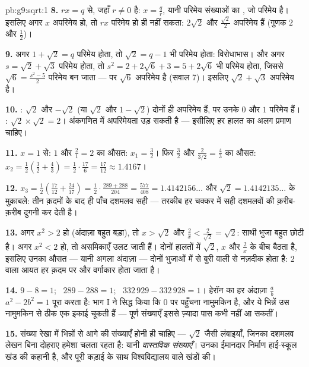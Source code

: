\begin{solution}{pb:g9:sqrt:1}
\textbf{8.} $r x = q$ से, जहाँ $r \neq 0$ है:
$x = \frac qr$, यानी परिमेय संख्याओं का , जो परिमेय है। इसलिए
अगर $x$ अपरिमेय हो, तो $r x$ परिमेय हो ही नहीं सकता: $2\sqrt2$ और
$\frac{\sqrt2}{2}$ अपरिमेय हैं (गुणक $2$ और $\frac12$)।

\textbf{9.} अगर $1 + \sqrt2 = q$ परिमेय होता, तो $\sqrt2 = q - 1$ भी
परिमेय होता: विरोधाभास। और अगर $s = \sqrt2 + \sqrt3$ परिमेय होता, तो
$s^2 = 2 + 2\sqrt6 + 3 = 5 + 2\sqrt6$ भी परिमेय होता, जिससे
$\sqrt6 = \frac{s^2 - 5}{2}$ परिमेय बन जाता --- पर $\sqrt6$ अपरिमेय
है (सवाल 7)। इसलिए $\sqrt2 + \sqrt3$ अपरिमेय है।

\textbf{10.} : $\sqrt2$ और $-\sqrt2$ (या $\sqrt2$ और
$1 - \sqrt2$) दोनों ही अपरिमेय हैं, पर उनके  $0$ और $1$ परिमेय
हैं। : $\sqrt2 \times \sqrt2 = 2$। अंकगणित में अपरिमेयता उड़
सकती है --- इसीलिए हर हालत का अलग प्रमाण चाहिए।

\textbf{11.} $x = 1$ से: $1$ और $\frac21 = 2$ का औसत:
$x_1 = \frac32$। फिर $\frac32$ और $\frac{2}{3/2} = \frac43$ का औसत:
$x_2 = \frac12\left(\frac32 + \frac43\right)
= \frac12 \cdot \frac{17}{6} = \frac{17}{12} \approx 1.4167$।

\textbf{12.} $x_3 = \frac12\left(\frac{17}{12} +
\frac{24}{17}\right) = \frac12 \cdot
\frac{289 + 288}{204} = \frac{577}{408} = 1.4142156\ldots$
और $\sqrt2 = 1.4142135\ldots$ के मुक़ाबले: तीन क़दमों के बाद ही पाँच
दशमलव सही --- तरकीब हर चक्कर में सही दशमलवों की  क़रीब-क़रीब
दुगनी कर देती है।

\textbf{13.} अगर $x^2 > 2$ हो (अंदाज़ा बहुत बड़ा), तो $x > \sqrt2$
और $\frac2x < \frac{2}{\sqrt2} = \sqrt2$: साथी भुजा बहुत छोटी है।
अगर $x^2 < 2$ हो, तो असमिकाएँ उलट जाती हैं। दोनों हालतों में
$\sqrt2$, $x$ और $\frac2x$ के बीच बैठता है, इसलिए उनका औसत --- यानी
अगला अंदाज़ा --- दोनों भुजाओं में से बुरी वाली से नज़दीक होता है:
 $2$ वाला आयत हर क़दम पर और वर्गाकार होता जाता है।

\textbf{14.} $9 - 8 = 1$; \ $289 - 288 = 1$; \
$332\,929 - 332\,928 = 1$। हेरॉन का हर अंदाज़ा $\frac ab$
$a^2 - 2b^2 = 1$ पूरा करता है: भाग I ने सिद्ध किया कि $0$ पर
पहुँचना नामुमकिन है, और ये भिन्नें उस नामुमकिन से ठीक एक इकाई चूकती
हैं --- पूर्ण संख्याएँ इससे ज़्यादा पास कभी नहीं आ सकतीं।

\textbf{15.} संख्या रेखा में भिन्नों से आगे की संख्याएँ होनी ही
चाहिए --- $\sqrt2$ जैसी लंबाइयाँ, जिनका दशमलव लेखन बिना दोहराए
हमेशा चलता रहता है: यानी \emph{वास्तविक संख्याएँ}। उनका ईमानदार
निर्माण हाई-स्कूल खंड की कहानी है, और पूरी कड़ाई के साथ
विश्वविद्यालय वाले खंडों की।

\end{solution}
